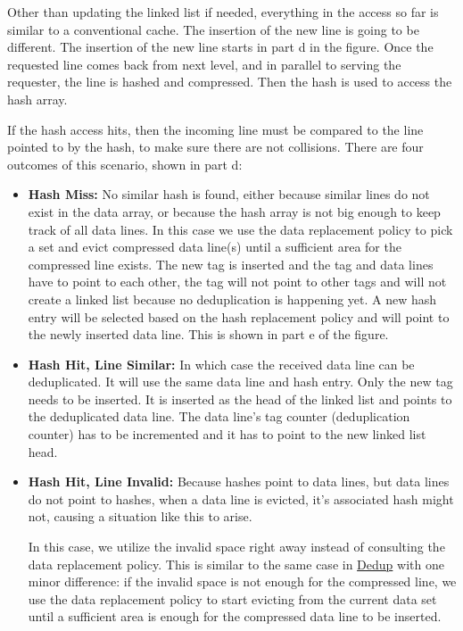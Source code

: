 Other than updating the linked list if needed, everything in the access so far is similar to a conventional cache. The insertion of the new line is going to be different. The insertion of the new line starts in part d in the figure. Once the requested line comes back from next level, and in parallel to serving the requester, the line is hashed and compressed. Then the hash is used to access the hash array.\par
If the hash access hits, then the incoming line must be compared to the line pointed to by the hash, to make sure there are not collisions. There are four outcomes of this scenario, shown in part d:
\begin{itemize}
    \item \textbf{Hash Miss:} No similar hash is found, either because similar lines do not exist in the data array, or because the hash array is not big enough to keep track of all data lines. In this case we use the data replacement policy to pick a set and evict compressed data line(s) until a sufficient area for the compressed line exists. The new tag is inserted and the tag and data lines have to point to each other, the tag will not point to other tags and will not create a linked list because no deduplication is happening yet. A new hash entry will be selected based on the hash replacement policy and will point to the newly inserted data line. This is shown in part e of the figure.
    \item \textbf{Hash Hit, Line Similar:} In which case the received data line can be deduplicated. It will use the same data line and hash entry. Only the new tag needs to be inserted. It is inserted as the head of the linked list and points to the deduplicated data line. The data line's tag counter (deduplication counter) has to be incremented and it has to point to the new linked list head.
    \item \textbf{Hash Hit, Line Invalid:}\label{itm:override} Because hashes point to data lines, but data lines do not point to hashes, when a data line is evicted, it's associated hash might not, causing a situation like this to arise.\par
        In this case, we utilize the invalid space right away instead of consulting the data replacement policy. This is similar to the same case in \hyperref[ssec:DedupOperations]{Dedup} with one minor difference: if the invalid space is not enough for the compressed line, we use the data replacement policy to start evicting from the current data set until a sufficient area is enough for the compressed data line to be inserted.\par

\end{itemize}
